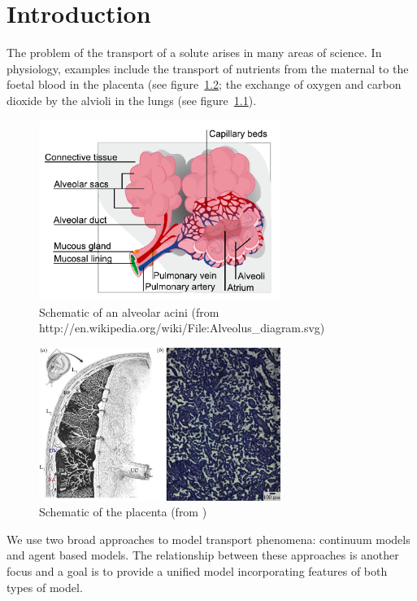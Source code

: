 \chapter{Introduction}
The problem of the transport of a solute arises in many areas of science. In
physiology, examples include the transport of nutrients from the maternal to the
foetal blood in the placenta (see figure~\ref{fig:placenta}; the exchange of oxygen
and carbon dioxide by the alvioli in the lungs (see figure~\ref{fig:alveolus}).

\begin{figure}[ht!]
    \centering
    \includegraphics[width=0.7\textwidth]{introduction/figures/alveolus}
    \caption{\label{fig:alveolus}Schematic of an alveolar acini (from
http://en.wikipedia.org/wiki/File:Alveolus\_diagram.svg)}
\end{figure}
\begin{figure}[ht!]
    \centering
    \includegraphics[width=0.7\textwidth]{introduction/figures/placentarast}
    \caption{\label{fig:placenta}Schematic of the placenta (from
    \cite{chernyavsky2012characterizing})}
\end{figure}


We use two broad approaches to model transport phenomena: continuum models and
agent based models. The relationship between these approaches is another focus
and a goal is to provide a unified model incorporating features of both types of
model.

